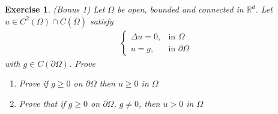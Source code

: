 \documentclass{report}
\theoremstyle{tommy}
\newtheorem{ex}[defn]{Exercise}
\begin{document}
\begin{ex} (Bonus 1)
  Let \(\Omega\) be open, bounded and connected in \(\mathbb{R}^d\). Let \(u \in C^2(\Omega) \cap C(\bar \Omega)\) satisfy
  \begin{align*}
    \begin{cases}
      \Delta u = 0, &\text{in } \Omega \\
      u = g, &\text{in } \partial \Omega
    \end{cases}
  \end{align*}
  with \(g \in C(\partial \Omega)\). Prove
  \begin{enumerate}
    \item Prove if \(g \ge 0\) on \(\partial \Omega\) then \(u \ge 0\) in \(\Omega\)
    \item Prove that if \(g \ge 0\) on \(\partial \Omega\), \(g \ne 0\), then \(u > 0\) in \(\Omega\)
  \end{enumerate}
\end{ex}
\end{document}
